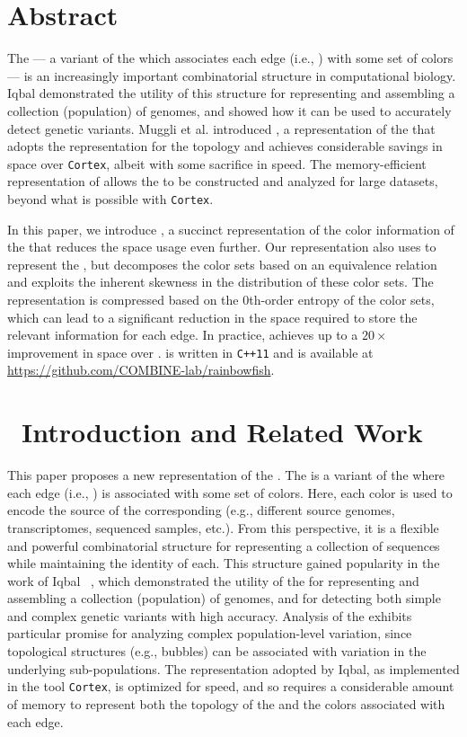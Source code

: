 \section{Abstract}
%
  The \cdbg --- a variant of the \dbg which associates each edge (i.e., \kmer)
  with some set of colors --- is an increasingly important combinatorial
  structure in computational biology. Iqbal \etal demonstrated the utility of
  this structure for representing and assembling a collection (population) of
  genomes, and showed how it can be used to accurately detect genetic variants.
  Muggli et al. introduced \vari, a representation of the \cdbg that adopts the
  \boss representation for the \dbg topology and achieves considerable savings
  in space over \texttt{Cortex}, albeit with some sacrifice in speed.  The
  memory-efficient representation of \vari allows the \cdbg to be constructed and
  analyzed for large datasets, beyond what is possible with \texttt{Cortex}.

In this paper, we introduce \system, a succinct representation of the color
information of the \cdbg that reduces the space usage even further. Our
representation also uses \boss to represent the \dbg, but decomposes the color
sets based on an equivalence relation and exploits the inherent skewness in the
distribution of these color sets. The \system representation is compressed based
on the $0$th-order entropy of the color sets, which can lead to a significant
reduction in the space required to store the relevant information for each edge. In practice,
\system achieves up to a $20\times$ improvement in space over \vari. \system is
written in \texttt{C++11} and is available at
\url{https://github.com/COMBINE-lab/rainbowfish}.
%


\section{~Introduction and Related Work}

This paper proposes a new representation of the \cdbg. The \cdbg is a variant of
the \dbg where each edge (i.e., \kmer) is associated with some set of colors.
Here, each color is used to encode the source of the corresponding \kmers (e.g.,
different source genomes, transcriptomes, sequenced samples, etc.). From this
perspective, it is a flexible and powerful combinatorial structure for
representing a collection of sequences while maintaining the identity of each.
This structure gained popularity in the work of Iqbal
\etal~\cite{Iqbal2012Novo}, which demonstrated the utility of the \cdbg for
representing and assembling a collection (population) of genomes, and for
detecting both simple and complex genetic variants with high accuracy. Analysis
of the \cdbg exhibits particular promise for analyzing complex population-level
variation, since topological structures (e.g., bubbles) can be associated with
variation in the underlying sub-populations. The representation adopted by
Iqbal, as implemented in the tool \texttt{Cortex}, is optimized for speed, and
so requires a considerable amount of memory to represent both the topology of
the \dbg and the colors associated with each edge.

